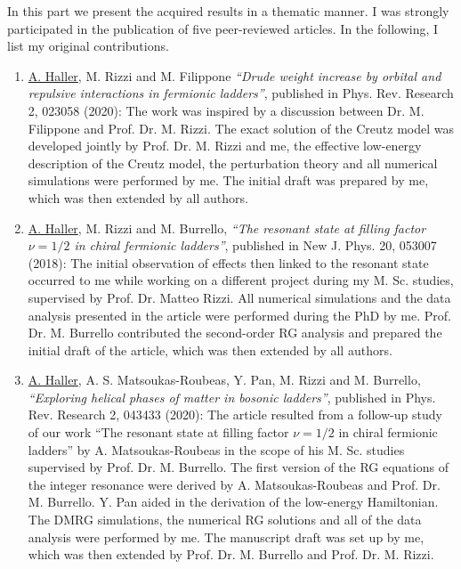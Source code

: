 
In this part we present the acquired results in a thematic manner.
I was strongly participated in the publication of five peer-reviewed articles.
In the following, I list my original contributions.

\begin{enumerate}
    \item{\underline{A. Haller}, M. Rizzi and M. Filippone {\it ``Drude weight increase by orbital and repulsive interactions in fermionic ladders''}, published in Phys. Rev. Research 2, 023058 (2020):
    The work was inspired by a discussion between Dr. M. Filippone and Prof. Dr. M. Rizzi. The exact solution of the Creutz model was developed jointly by Prof. Dr. M. Rizzi and me, the effective low-energy description of the Creutz model, the perturbation theory and all numerical simulations were performed by me. The initial draft was prepared by me, which was then extended by all authors.}
    \item{\underline{A. Haller}, M. Rizzi and M. Burrello, {\it ``The resonant state at filling factor $\nu=1/2$ in chiral fermionic ladders''}, published in New J. Phys. 20, 053007 (2018): The initial observation of effects then linked to the resonant state occurred to me while working on a different project during my M. Sc. studies, supervised by Prof. Dr. Matteo Rizzi. All numerical simulations and the data analysis presented in the article were performed during the PhD by me. Prof. Dr. M. Burrello contributed the second-order RG analysis and prepared the initial draft of the article, which was then extended by all authors.}
    \item{\underline{A. Haller}, A. S. Matsoukas-Roubeas, Y. Pan, M. Rizzi and M. Burrello, {\it ``Exploring helical phases of matter in bosonic ladders''}, published in Phys. Rev. Research 2, 043433 (2020):
    The article resulted from a follow-up study of our work ``The resonant state at filling factor $\nu=1/2$ in chiral fermionic ladders'' by A. Matsoukas-Roubeas in the scope of his M. Sc. studies supervised by Prof. Dr. M. Burrello. The first version of the RG equations of the integer resonance were derived by A. Matsoukas-Roubeas and Prof. Dr. M. Burrello. Y. Pan aided in the derivation of the low-energy Hamiltonian. The DMRG simulations, the numerical RG solutions and all of the data analysis were performed by me. The manuscript draft was set up by me, which was then extended by Prof. Dr. M. Burrello and Prof. Dr. M. Rizzi.}

\end{enumerate}
